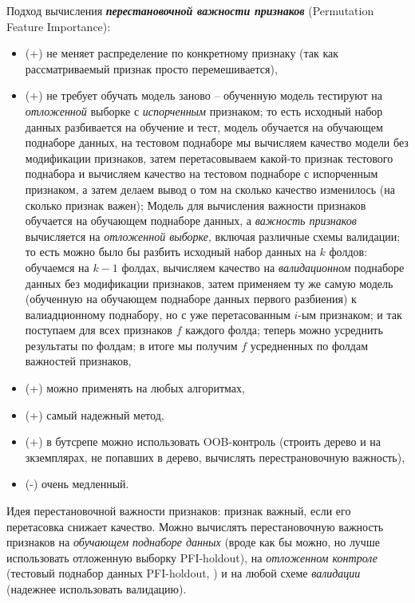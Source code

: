 \documentclass[%
	11pt,
	a4paper,
	utf8,
		]{article}
\begin{document}
Подход вычисления \textbf{\itshape перестановочной важности признаков} (Permutation Feature Importance):
\begin{itemize}
	\item (+) не меняет распределение по конкретному признаку (так как рассматриваемый признак просто перемешивается),
	
	\item (+) не требует обучать модель заново -- обученную модель тестируют на \emph{\color{red}отложенной} выборке с \emph{\color{red}испорченным} признаком; то есть исходный набор данных разбивается на обучение и тест, модель обучается на обучающем поднаборе данных, на тестовом поднаборе мы вычисляем качество модели без модификации признаков, затем перетасовываем какой-то признак тестового поднабора и вычисляем качество на тестовом поднаборе с испорченным признаком, а затем делаем вывод о том на сколько качество изменилось (на сколько признак важен); Модель для вычисления важности признаков обучается на обучающем поднаборе данных, а \emph{важность признаков} вычисляется на \emph{\color{red}отложенной выборке}, включая различные схемы валидации; то есть можно было бы разбить исходный набор данных на $ k $ фолдов: обучаемся на $ k - 1 $ фолдах, вычисляем качество на \emph{валидационном} поднаборе данных без модификации признаков, затем применяем ту же самую модель (обученную на обучающем поднаборе данных первого разбиения) к валиадционному поднабору, но с уже перетасованным $ i $-ым признаком; и так поступаем для всех признаков $ f $ каждого фолда; теперь можно усреднить результаты по фолдам; в итоге мы получим $ f $ усредненных по фолдам важностей признаков,
	
	\item (+) можно применять на любых алгоритмах,
	
	\item (+) самый надежный метод,
	
	\item (+) в бутсрепе можно использовать OOB-контроль (строить дерево и на зкземплярах, не попавших в дерево, вычислять перестрановочную важность),
	
	\item (-) очень медленный.
\end{itemize}


Идея перестановочной важности признаков: признак важный, если его перетасовка снижает качество. Можно вычислять перестановочную важность признаков на \emph{обучающем поднаборе данных} (вроде как бы можно, но лучше использовать отложенную выборку PFI-holdout), на \emph{отложенном контроле} (тестовый поднабор данных PFI-holdout, ) и на любой схеме \emph{валидации} (надежнее использовать валидацию). 
\end{document}
